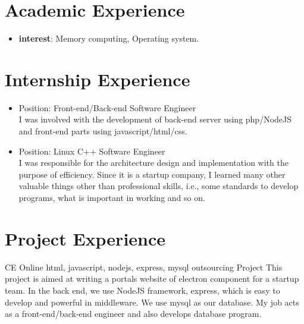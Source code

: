 \documentclass[11pt,a4paper]{moderncv}
\begin{document}
\section{Academic Experience}
{
\begin{itemize}
    \item \textbf{interest}: Memory computing, Operating system.
\end{itemize}
}


\section{Internship Experience}

{
\begin{itemize}
\item Position: Front-end/Back-end Software Engineer\\
I was involved with the development of back-end server using php/NodeJS and front-end parts using javascript/html/css.
\end{itemize}
}

{
\begin{itemize}
\item Position: Linux C++ Software Engineer\\
I was responsible for the architecture design and implementation with the purpose of efficiency. Since it is a startup company, I learned many other valuable things other than professional skills, i.e., some standards to develop programs, what is important in working and so on.
\end{itemize}
}

\section{Project Experience}
{CE Online}
{html, javascript, nodejs, express, mysql}
{outsourcing Project}
{}
{
This project is aimed at writing a portals website of electron component for a startup team. In the back end, we use NodeJS framework, express, which is easy to develop and powerful in middleware. We use mysql as our database. My job acts as a front-end/back-end engineer and also develops database program.\\
}
\end{document}
